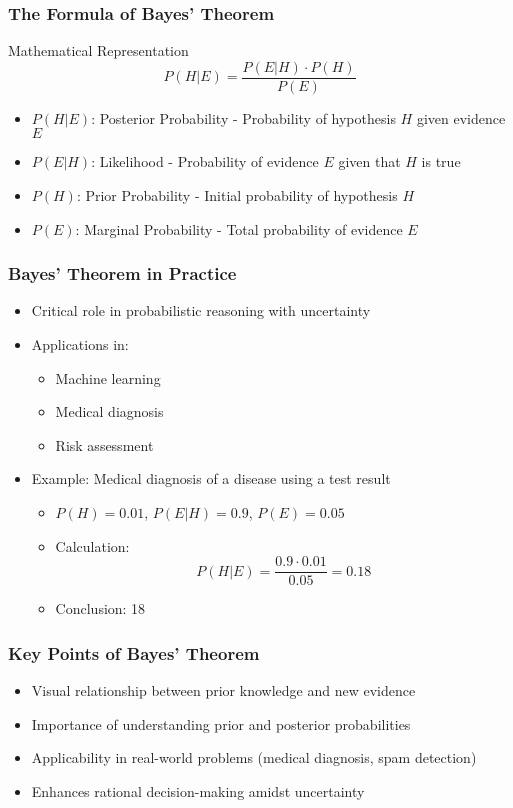 \documentclass[aspectratio=169]{beamer}
\begin{document}
\begin{frame}[fragile]
    \frametitle{The Formula of Bayes' Theorem}
    \begin{block}{Mathematical Representation}
        \[
        P(H|E) = \frac{P(E|H) \cdot P(H)}{P(E)}
        \]
    \end{block}
    \begin{itemize}
        \item \(P(H|E)\): Posterior Probability - Probability of hypothesis \(H\) given evidence \(E\)
        \item \(P(E|H)\): Likelihood - Probability of evidence \(E\) given that \(H\) is true
        \item \(P(H)\): Prior Probability - Initial probability of hypothesis \(H\)
        \item \(P(E)\): Marginal Probability - Total probability of evidence \(E\)
    \end{itemize}
\end{frame}

\begin{frame}[fragile]
    \frametitle{Bayes' Theorem in Practice}
    \begin{itemize}
        \item Critical role in probabilistic reasoning with uncertainty 
        \item Applications in:
            \begin{itemize}
                \item Machine learning
                \item Medical diagnosis
                \item Risk assessment
            \end{itemize}
        \item Example: Medical diagnosis of a disease using a test result
        \begin{itemize}
            \item \(P(H) = 0.01\), \(P(E|H) = 0.9\), \(P(E) = 0.05\)
            \item Calculation: \[
                P(H|E) = \frac{0.9 \cdot 0.01}{0.05} = 0.18
            \]
            \item Conclusion: 18%
        \end{itemize}
    \end{itemize}
\end{frame}

\begin{frame}[fragile]
    \frametitle{Key Points of Bayes' Theorem}
    \begin{itemize}
        \item Visual relationship between prior knowledge and new evidence
        \item Importance of understanding prior and posterior probabilities
        \item Applicability in real-world problems (medical diagnosis, spam detection)
        \item Enhances rational decision-making amidst uncertainty
    \end{itemize}
\end{frame}
\end{document}

